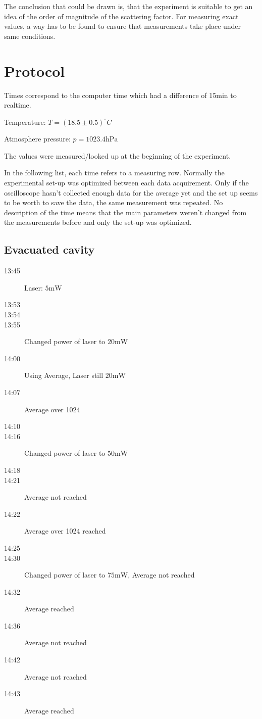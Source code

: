 \documentclass[
	parskip=half,10pt,
	numbers= noenddot, %
	toc=flat, %
	oneside,
	twocolumn,
	]{scrartcl}
\begin{document}
The conclusion that could be drawn is, that the experiment is suitable to get an idea of the order of magnitude of the scattering factor. For measuring exact values, a 
way has to be found to ensure that measurements take place under same conditions.

\section{Protocol}
Times correspond to the computer time which had a difference of 15min to realtime.

Temperature: $T=(18.5\pm 0.5)^\circ C$

Atmosphere pressure: $p=1023.4\si{\hecto \pascal}$\cite{wetter}

The values were measured/looked up at the beginning of the experiment.

In the following list, each time refers to a measuring row. Normally the experimental set-up was optimized between each data acquirement. Only if the oscilloscope hasn't collected enough data for the average yet and the set up seems to be worth to save the data, the same measurement was repeated.
No description of the time means that the main parameters weren't changed from the measurements before and only the set-up was optimized. 
\subsection*{Evacuated cavity}  
\begin{description}
\item[13:45] Laser: $5\si{\milli \watt}$
\item[13:53]
\item[13:54]
\item[13:55] Changed power of laser to $20\si{\milli \watt}$
\item[14:00] Using Average, Laser still $20\si{\milli \watt}$
\item[14:07] Average over 1024
\item[14:10]
\item[14:16] Changed power of laser to $50\si{\milli \watt}$
\item[14:18]
\item[14:21] Average not reached
\item[14:22] Average over 1024 reached
\item[14:25]
\item[14:30] Changed power of laser to $75\si{\milli \watt}$, Average not reached
\item[14:32] Average reached
\item[14:36] Average not reached
\item[14:42] Average not reached
\item[14:43] Average reached
\end{description}
\end{document}
